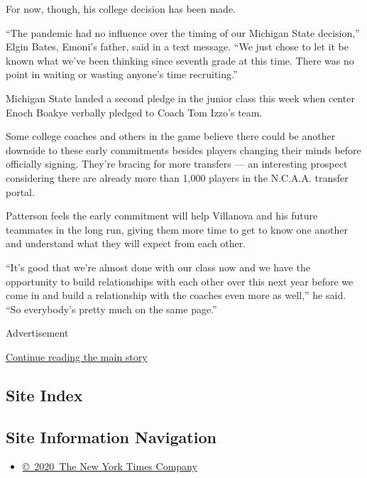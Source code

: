 For now, though, his college decision has been made.

``The pandemic had no influence over the timing of our Michigan State
decision,'' Elgin Bates, Emoni's father, said in a text message. ``We
just chose to let it be known what we've been thinking since seventh
grade at this time. There was no point in waiting or wasting anyone's
time recruiting.''

Michigan State landed a second pledge in the junior class this week when
center Enoch Boakye verbally pledged to Coach Tom Izzo's team.

Some college coaches and others in the game believe there could be
another downside to these early commitments besides players changing
their minds before officially signing. They're bracing for more
transfers --- an interesting prospect considering there are already more
than 1,000 players in the N.C.A.A. transfer portal.

Patterson feels the early commitment will help Villanova and his future
teammates in the long run, giving them more time to get to know one
another and understand what they will expect from each other.

``It's good that we're almost done with our class now and we have the
opportunity to build relationships with each other over this next year
before we come in and build a relationship with the coaches even more as
well,'' he said. ``So everybody's pretty much on the same page.''

Advertisement

\protect\hyperlink{after-bottom}{Continue reading the main story}

\hypertarget{site-index}{%
\subsection{Site Index}\label{site-index}}

\hypertarget{site-information-navigation}{%
\subsection{Site Information
Navigation}\label{site-information-navigation}}

\begin{itemize}
\tightlist
\item
  \href{https://help.nytimes3xbfgragh.onion/hc/en-us/articles/115014792127-Copyright-notice}{©~2020~The
  New York Times Company}
\end{itemize}

